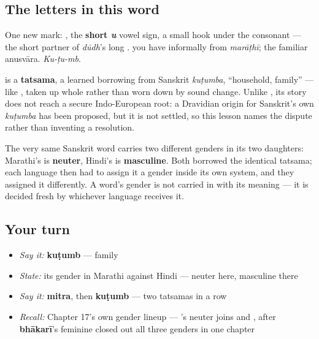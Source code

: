 \subsection*{The letters in this word}
One new mark: \textbf{}, the \textbf{short \emph{u}} vowel sign, a small hook under the consonant — the short partner of \emph{dūdh}'s long \textbf{}. \textbf{} you have informally from \emph{marāṭhī}; \textbf{} the familiar anusvāra. \emph{Ku-ṭu-mb}.

\begin{cousinweb}
\textbf{} is a \textbf{tatsama}, a learned borrowing from Sanskrit \textbf{} \emph{kuṭumba}, \textquotedblleft{}household, family\textquotedblright{} — like \textbf{}, taken up whole rather than worn down by sound change. Unlike \textbf{}, its story does not reach a secure Indo-European root: a Dravidian origin for Sanskrit's own \emph{kuṭumba} has been proposed, but it is not settled, so this lesson names the dispute rather than inventing a resolution.
\end{cousinweb}

\begin{grammarlens}[title={Grammar Lens: a gender Hindi disagrees with}]
The very same Sanskrit word carries two different genders in its two daughters: Marathi's \textbf{} is \textbf{neuter}, Hindi's \textbf{} is \textbf{masculine}. Both borrowed the identical tatsama; each language then had to assign it a gender inside its own system, and they assigned it differently. A word's gender is not carried in with its meaning — it is decided fresh by whichever language receives it.
\end{grammarlens}

\subsection*{Your turn}
\begin{itemize}
\raggedright
  \item \emph{Say it:} \textbf{kuṭumb} — family
  \item \emph{State:} its gender in Marathi against Hindi — neuter here, masculine there
  \item \emph{Say it:} \textbf{mitra}, then \textbf{kuṭumb} — two tatsamas in a row
  \item \emph{Recall:} Chapter 17's own gender lineup — \textbf{}'s neuter joins \textbf{} and \textbf{}, after \textbf{bhākarī}'s feminine closed out all three genders in one chapter
\end{itemize}


